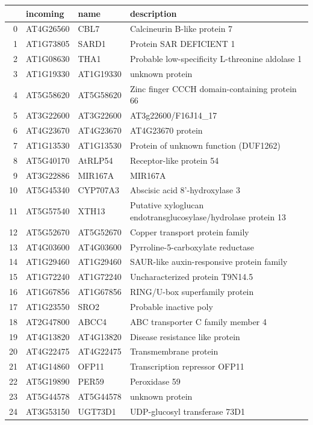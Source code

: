 \documentclass[11pt]{article}
\begin{document}
\begin{center}
\begin{tabular}{rlll}
 & incoming & name & description\\
\hline
0 & AT4G26560 & CBL7 & Calcineurin B-like protein 7\\
1 & AT1G73805 & SARD1 & Protein SAR DEFICIENT 1\\
2 & AT1G08630 & THA1 & Probable low-specificity L-threonine aldolase 1\\
3 & AT1G19330 & AT1G19330 & unknown protein\\
4 & AT5G58620 & AT5G58620 & Zinc finger CCCH domain-containing protein 66\\
5 & AT3G22600 & AT3G22600 & AT3g22600/F16J14\_17\\
6 & AT4G23670 & AT4G23670 & AT4G23670 protein\\
7 & AT1G13530 & AT1G13530 & Protein of unknown function (DUF1262)\\
8 & AT5G40170 & AtRLP54 & Receptor-like protein 54\\
9 & AT3G22886 & MIR167A & MIR167A\\
10 & AT5G45340 & CYP707A3 & Abscisic acid 8'-hydroxylase 3\\
11 & AT5G57540 & XTH13 & Putative xyloglucan endotransglucosylase/hydrolase protein 13\\
12 & AT5G52670 & AT5G52670 & Copper transport protein family\\
13 & AT4G03600 & AT4G03600 & Pyrroline-5-carboxylate reductase\\
14 & AT1G29460 & AT1G29460 & SAUR-like auxin-responsive protein family\\
15 & AT1G72240 & AT1G72240 & Uncharacterized protein T9N14.5\\
16 & AT1G67856 & AT1G67856 & RING/U-box superfamily protein\\
17 & AT1G23550 & SRO2 & Probable inactive poly\\
18 & AT2G47800 & ABCC4 & ABC transporter C family member 4\\
19 & AT4G13820 & AT4G13820 & Disease resistance like protein\\
20 & AT4G22475 & AT4G22475 & Transmembrane protein\\
21 & AT4G14860 & OFP11 & Transcription repressor OFP11\\
22 & AT5G19890 & PER59 & Peroxidase 59\\
23 & AT5G44578 & AT5G44578 & unknown protein\\
24 & AT3G53150 & UGT73D1 & UDP-glucosyl transferase 73D1\\

\end{tabular}
\end{center}
\end{document}
